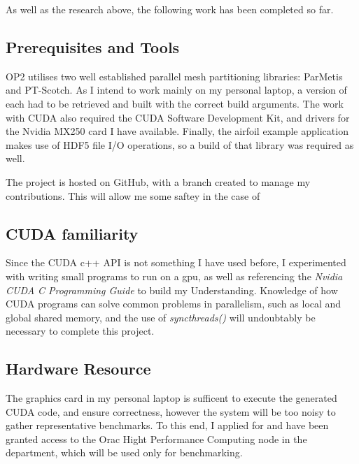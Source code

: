 \documentclass[11pt]{article}
\begin{document}
As well as the research above, the following work has been completed so far.
\subsection*{Prerequisites and Tools}
OP2 utilises two well established parallel mesh partitioning libraries: ParMetis\cite{metis} and PT-Scotch\cite{scotch}. As I intend to work mainly on my personal laptop, a version of each had to be retrieved and built with the correct build arguments. The work with CUDA also required the CUDA Software Development Kit\cite{cuda}, and drivers for the Nvidia MX250 card I have available. Finally, the airfoil example application makes use of HDF5 file I/O operations, so a build of that library was required as well. 
\par
The project is hosted on GitHub, with a branch created to manage my contributions. This will allow me some saftey in the case of  
\subsection*{CUDA familiarity}
Since the CUDA c++ API is not something I have used before, I experimented with writing small programs to run on a gpu, as well as referencing the \textit{Nvidia CUDA C Programming Guide} to build my Understanding. Knowledge of how CUDA programs can solve common problems in parallelism, such as local and global shared memory, and the use of \textit{syncthreads()} will undoubtably be necessary to complete this project.

\subsection*{Hardware Resource}
The graphics card in my personal laptop is sufficent to execute the generated CUDA code, and ensure correctness, however the system will be too noisy to gather representative benchmarks. To this end, I applied for and have been granted access to the Orac Hight Performance Computing node in the department, which will be used only for benchmarking.
\end{document}
